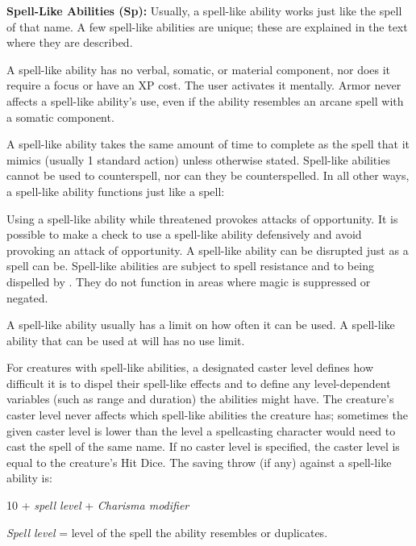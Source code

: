 \textbf{Spell-Like Abilities (Sp):} Usually, a spell-like ability works just like the spell of that name. A few spell-like abilities are unique; these are explained in the text where they are described.

A spell-like ability has no verbal, somatic, or material component, nor does it require a focus or have an XP cost. The user activates it mentally. Armor never affects a spell-like ability's use, even if the ability resembles an arcane spell with a somatic component.

A spell-like ability takes the same amount of time to complete as the spell that it mimics (usually 1 standard action) unless otherwise stated. Spell-like abilities cannot be used to counterspell, nor can they be counterspelled. In all other ways, a spell-like ability functions just like a spell:

Using a spell-like ability while threatened provokes attacks of opportunity. It is possible to make a  check to use a spell-like ability defensively and avoid provoking an attack of opportunity. A spell-like ability can be disrupted just as a spell can be. Spell-like abilities are subject to spell resistance and to being dispelled by . They do not function in areas where magic is suppressed or negated.

A spell-like ability usually has a limit on how often it can be used. A spell-like ability that can be used at will has no use limit.

For creatures with spell-like abilities, a designated caster level defines how difficult it is to dispel their spell-like effects and to define any level-dependent variables (such as range and duration) the abilities might have. The creature's caster level never affects which spell-like abilities the creature has; sometimes the given caster level is lower than the level a spellcasting character would need to cast the spell of the same name. If no caster level is specified, the caster level is equal to the creature's Hit Dice. The saving throw (if any) against a spell-like ability is:

\begin{Formula*}{10 + \textit{spell level} + \textit{Charisma modifier}}
	\item \textit{Spell level} = level of the spell the ability resembles or duplicates.
\end{Formula*}


